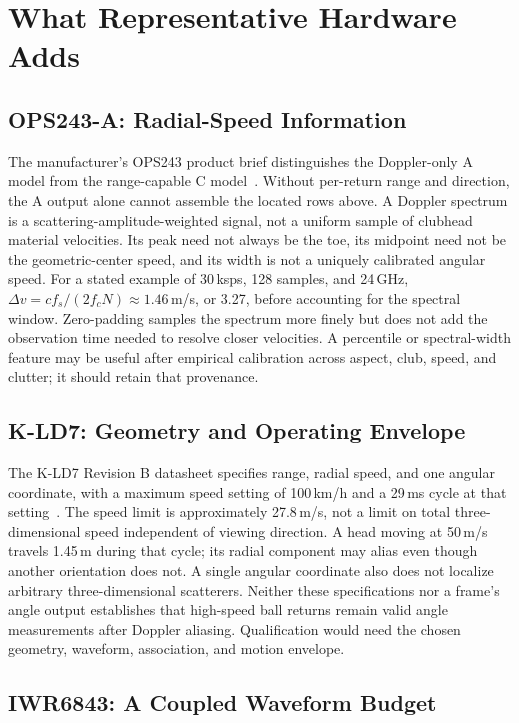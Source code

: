 \section{What Representative Hardware Adds}
\label{sec:screw-ceiling}

\subsection{OPS243-A: Radial-Speed Information}

The manufacturer's OPS243 product brief distinguishes the Doppler-only A model from the range-capable C model~\cite{ops243brief}.
Without per-return range and direction, the A output alone cannot assemble the located rows above.
A Doppler spectrum is a scattering-amplitude-weighted signal, not a uniform sample of clubhead material velocities.
Its peak need not always be the toe, its midpoint need not be the geometric-center speed, and its width is not a uniquely calibrated angular speed.
For a stated example of 30\,ksps, 128 samples, and 24\,GHz, $\Delta v=cf_s/(2f_cN)\approx1.46$\,m/s, or 3.27\mph{}, before accounting for the spectral window.
Zero-padding samples the spectrum more finely but does not add the observation time needed to resolve closer velocities.
A percentile or spectral-width feature may be useful after empirical calibration across aspect, club, speed, and clutter; it should retain that provenance.

\subsection{K-LD7: Geometry and Operating Envelope}

The K-LD7 Revision B datasheet specifies range, radial speed, and one angular coordinate, with a maximum speed setting of 100\,km/h and a 29\,ms cycle at that setting~\cite{kld7}.
The speed limit is approximately 27.8\,m/s, not a limit on total three-dimensional speed independent of viewing direction.
A head moving at 50\,m/s travels 1.45\,m during that cycle; its radial component may alias even though another orientation does not.
A single angular coordinate also does not localize arbitrary three-dimensional scatterers.
Neither these specifications nor a frame's angle output establishes that high-speed ball returns remain valid angle measurements after Doppler aliasing.
Qualification would need the chosen geometry, waveform, association, and motion envelope.

\subsection{IWR6843: A Coupled Waveform Budget}

